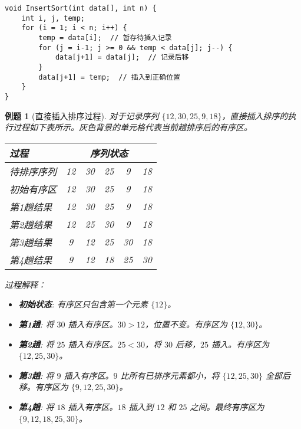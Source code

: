 \documentclass[12pt,a4paper]{amsart}
\newtheorem{example}{例题}[section]
\begin{document}
\begin{lstlisting}[caption=直接插入排序实现]
void InsertSort(int data[], int n) {
    int i, j, temp;
    for (i = 1; i < n; i++) {
        temp = data[i];  // 暂存待插入记录
        for (j = i-1; j >= 0 && temp < data[j]; j--) {
            data[j+1] = data[j];  // 记录后移
        }
        data[j+1] = temp;  // 插入到正确位置
    }
}
\end{lstlisting}

\begin{example}[直接插入排序过程]
对于记录序列 $\{12, 30, 25, 9, 18\}$，直接插入排序的执行过程如下表所示。灰色背景的单元格代表当前趟排序后的有序区。
\begin{center}
\label{tab:insertion_sort_example}
\begin{tabular}{l|c c c c c}
\toprule
\textbf{过程} & \multicolumn{5}{c}{\textbf{序列状态}} \\
\midrule
待排序序列 & 12 & 30 & 25 & 9 & 18 \\
初始有序区 & \cellcolor{gray!25}12 & 30 & 25 & 9 & 18 \\
第1趟结果 & \cellcolor{gray!25}12 & \cellcolor{gray!25}30 & 25 & 9 & 18 \\
第2趟结果 & \cellcolor{gray!25}12 & \cellcolor{gray!25}25 & \cellcolor{gray!25}30 & 9 & 18 \\
第3趟结果 & \cellcolor{gray!25}9 & \cellcolor{gray!25}12 & \cellcolor{gray!25}25 & \cellcolor{gray!25}30 & 18 \\
第4趟结果 & \cellcolor{gray!25}9 & \cellcolor{gray!25}12 & \cellcolor{gray!25}18 & \cellcolor{gray!25}25 & \cellcolor{gray!25}30 \\
\bottomrule
\end{tabular}
\end{center}
过程解释：
\begin{itemize}
    \item \textbf{初始状态}: 有序区只包含第一个元素 $\{12\}$。
    \item \textbf{第1趟}: 将 $30$ 插入有序区。$30 > 12$，位置不变。有序区为 $\{12, 30\}$。
    \item \textbf{第2趟}: 将 $25$ 插入有序区。$25 < 30$，将 $30$ 后移，$25$ 插入。有序区为 $\{12, 25, 30\}$。
    \item \textbf{第3趟}: 将 $9$ 插入有序区。$9$ 比所有已排序元素都小，将 $\{12, 25, 30\}$ 全部后移。有序区为 $\{9, 12, 25, 30\}$。
    \item \textbf{第4趟}: 将 $18$ 插入有序区。$18$ 插入到 $12$ 和 $25$ 之间。最终有序区为 $\{9, 12, 18, 25, 30\}$。
\end{itemize}
\end{example}
\end{document}
